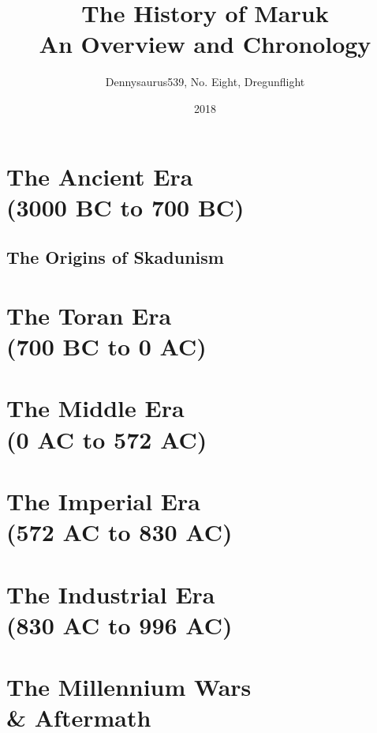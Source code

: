 \documentclass[a5paper, 11pt, openright, twoside]{book}
\title{The History of Maruk\\\large{An Overview and Chronology}}
\date{2018}
\author{Dennysaurus539, No. Eight, Dregunflight}
\begin{document}
	
	
	\part{The Ancient Era\\ (3000 BC to 700 BC)}
		\chapter{The Origins of Skadunism}
		
	\part{The Toran Era\\ (700 BC to 0 AC)}
		
	\part{The Middle Era\\ (0 AC to 572 AC)}
		
	\part{The Imperial Era\\ (572 AC to 830 AC)}
		
	\part{The Industrial Era\\ (830 AC to 996 AC)}
		
	\part{The Millennium Wars\\ \& Aftermath} 
	\printindex
\end{document}
